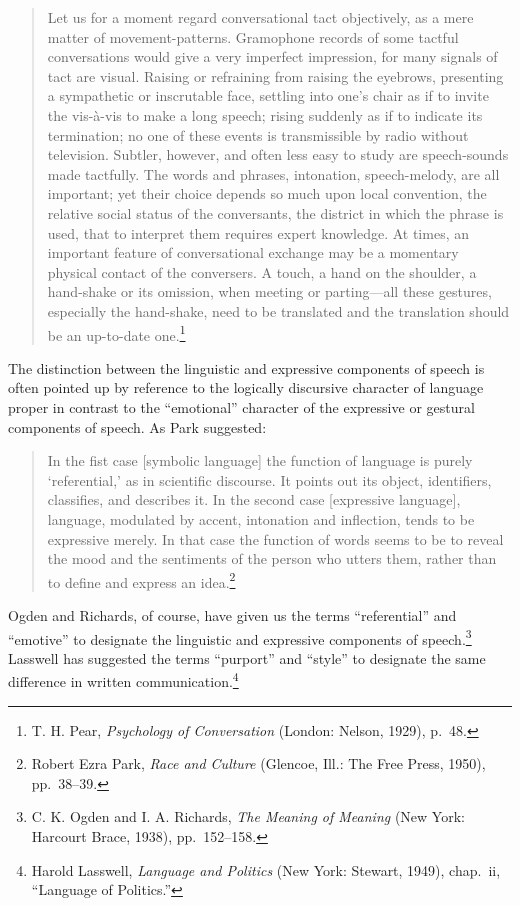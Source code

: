 \documentclass[twoside,symmetric,nobib,justified]{tufte-book}
\begin{document}
\begin{quote}
Let us for a moment regard conversational tact objectively, as a mere
matter of movement-patterns. Gramophone records of some tactful
conversations would give a very imperfect impression, for many signals
of tact are visual. Raising or refraining from raising the eyebrows,
presenting a sympathetic or inscrutable face, settling into one's chair
as if to invite the vis-à-vis to make a long speech; rising suddenly as
if to indicate its termination; no one of these events is transmissible
by radio without television. Subtler, however, and often less easy to
study are speech-sounds made tactfully. The words and phrases,
intonation, speech-melody, are all important; yet their choice depends
so much upon local convention, the relative social status of the
conversants, the district in which the phrase is used, that to interpret
them requires expert knowledge. At times, an important feature of
conversational exchange may be a momentary physical contact of the
conversers. A touch, a hand on the shoulder, a hand-shake or its
omission, when meeting or parting---all these gestures, especially the
hand-shake, need to be translated and the translation should be an
up-to-date one.\footnote{T. H. Pear, \emph{Psychology of Conversation}
  (London: Nelson, 1929), p.~48.}
\end{quote}

\noindent The distinction between the linguistic and expressive components of
speech is often pointed up by reference to the logically discursive
character of language proper in contrast to the ``emotional'' character
of the expressive or gestural components of speech. As Park suggested:

\begin{quote}
In the fist case {[}symbolic language{]} the function of language is
purely `referential,' as in scientific discourse. It points out its
object, identifiers, classifies, and describes it. In the second case
{[}expressive language{]}, language, modulated by accent, intonation and
inflection, tends to be expressive merely. In that case the function of
words seems to be to reveal the mood and the sentiments of the person
who utters them, rather than to define and express an idea.\footnote{Robert
  Ezra Park, \emph{Race and Culture} (Glencoe, Ill.: The Free Press,
  1950), pp.~38--39.}
\end{quote}

\noindent Ogden and Richards, of course, have given us the terms ``referential''
and ``emotive'' to designate the linguistic and expressive components of
speech.\footnote{C. K. Ogden and I. A. Richards, \emph{The Meaning of
  Meaning} (New York: Harcourt Brace, 1938), pp.~152--158.} Lasswell has
suggested the terms ``purport'' and ``style'' to designate the same
difference in written communication.\footnote{Harold Lasswell,
  \emph{Language and Politics} (New York: Stewart, 1949), chap.~ii,
  ``Language of Politics.''}
\end{document}
